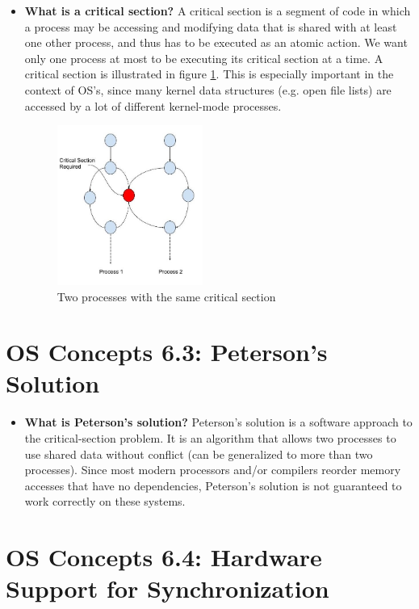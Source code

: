\documentclass[12pt]{article}
\begin{document}
\begin{itemize}
    \item \textbf{What is a critical section?} A critical section is a segment of code in which a process may be accessing and modifying data that is shared with at least one other process, and thus has to be executed as an atomic action. We want only one process at most to be executing its critical section at a time. A critical section is illustrated in figure \ref{fig:critical-section}. This is especially important in the context of OS's, since many kernel data structures (e.g. open file lists) are accessed by a lot of different kernel-mode processes.
    \begin{figure}[ht]
        \centering
        \includegraphics[width=0.45\textwidth]{figures/critical-section.jpg}
        \caption{Two processes with the same critical section}
        \label{fig:critical-section}
    \end{figure}
\end{itemize}

\section*{OS Concepts 6.3: Peterson's Solution}

\begin{itemize}
    \item \textbf{What is Peterson's solution?} Peterson's solution is a software approach to the critical-section problem. It is an algorithm that allows two processes to use shared data without conflict (can be generalized to more than two processes). Since most modern processors and/or compilers reorder memory accesses that have no dependencies, Peterson's solution is not guaranteed to work correctly on these systems.
\end{itemize}

\section*{OS Concepts 6.4: Hardware Support for Synchronization}
\end{document}
